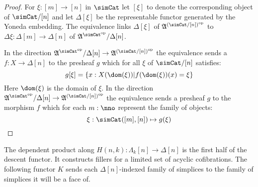 \documentclass{tac}
\newcommand\set[1]{\left\{#1\right\}}
\newcommand\dual{^{\mathrm{op}}}
\newcommand\s{^{\simCat\dual}}
\newcommand\of{:}
\newcommand\simplex\Delta
\newcommand\horn\Lambda
\newcommand\ambient{\mathfrak A}
\begin{document}
\begin{proof} For $\xi\of[m]\to[n]$ in $\simCat$ let $[\xi]$ to denote the corresponding object of $\simCat/[n]$ and let $\simplex[\xi]$ be the representable functor generated by the Yoneda embedding. The equivalence links $\simplex[\xi]$ of $\ambient^{(\simCat/[n])\dual}$ to $\Delta\xi\of \simplex[m]\to \simplex[n]$ of $\ambient\s/\simplex[n]$.

In the direction $\ambient\s/\simplex[n]\to \ambient^{(\simCat/[n])\dual}$ the equivalence sends a $f\of X\to \simplex[n]$ to the presheaf $g$ which for all $\xi$ of $\simCat/[n]$ satisfies:
\[ g[\xi] = \set{ x\of X(\dom(\xi)) | f(\dom(\xi))(x)=\xi } \]
Here $\dom(\xi)$ is the domain of $\xi$.
In the direction $\ambient\s/\simplex[n]\to \ambient^{(\simCat/[n])\dual}$ the equivalence sends a presheaf $g$ to the morphism $f$ which for each $m\of\nno$ represent the family of objects:
\[ \xi\of\simCat([m],[n])\mapsto g(\xi) \]
\end{proof}


The dependent product along $H(n,k)\of \horn_k[n]\to\simplex[n]$ is the first half of the descent functor. It constructs fillers for a limited set of acyclic cofibrations. The following functor $K$ sends each $\simplex[n]$-indexed family of simplices to the family of simplices it will be a face of.
\end{document}
